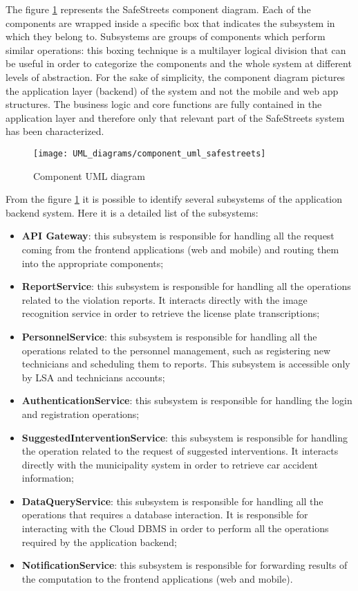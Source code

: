 The figure \ref{fig:component_diagram} represents the SafeStreets component diagram. Each of the components are wrapped inside a specific box that indicates the subsystem in which they belong to.
Subsystems are groups of components which perform similar operations: this boxing technique is a multilayer logical division that can be useful in order to categorize the components and the whole system at different levels of abstraction.
\newline For the sake of simplicity, the component diagram pictures the application layer (backend) of the system and not the mobile and web app structures. The business logic and core functions are fully contained in the application layer and therefore only that relevant part of the SafeStreets system has been characterized.
\begin{figure}[H]
    \centering
    \texttt{[image: UML\_diagrams/component\_uml\_safestreets]}
    \caption{Component UML diagram}
    \label{fig:component_diagram}
\end{figure}
From the figure \ref{fig:component_diagram} it is possible to identify several subsystems of the application backend system. Here it is a detailed list of the subsystems:
\begin{itemize}
    \item \textbf{API Gateway}: this subsystem is responsible for handling all the request coming from the frontend applications (web and mobile) and routing them into the appropriate components;
    \item \textbf{ReportService}: this subsystem is responsible for handling all the operations related to the violation reports. It interacts directly with the image recognition service in order to retrieve the license plate transcriptions;
    \item \textbf{PersonnelService}: this subsystem is responsible for handling all the operations related to the personnel management, such as registering new technicians and scheduling them to reports. This subsystem is accessible only by LSA and technicians accounts;
    \item \textbf{AuthenticationService}: this subsystem is responsible for handling the login and registration operations;
    \item \textbf{SuggestedInterventionService}: this subsystem is responsible for handling the operation related to the request of suggested interventions. It interacts directly with the municipality system in order to retrieve car accident information;
    \item \textbf{DataQueryService}: this subsystem is responsible for handling all the operations that requires a database interaction. It is responsible for interacting with the Cloud DBMS in order to perform all the operations required by the application backend;
    \item \textbf{NotificationService}: this subsystem is responsible for forwarding results of the computation to the frontend applications (web and mobile).
\end{itemize} 
